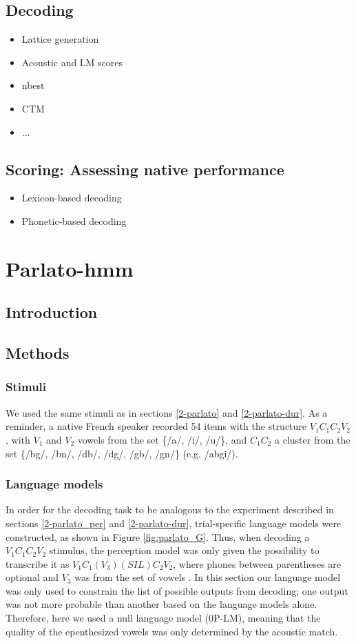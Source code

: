 \subsection{Decoding}
\begin{itemize}
\item Lattice generation
\item Acoustic and LM scores 
\item nbest
\item CTM
\item ...
\end{itemize}

\subsection{Scoring: Assessing native performance}
\begin{itemize}
\item Lexicon-based decoding
\item Phonetic-based decoding
\end{itemize}

\newpage
\section{{\color{red}Parlato-hmm}} \label{3-parlato-hmm}
\subsection{Introduction}
\subsection{Methods}
\subsubsection{Stimuli}
We used the same stimuli as in sections \ref{2-parlato} and \ref{2-parlato-dur}. As a reminder, a native French speaker recorded 54 items with the structure $V_{1}C_{1}C_{2}V_{2}$, with $V_{1}$ and $V_{2}$ vowels from the set \{/a/, /i/, /u/\}, and $C_{1}C_{2}$ a cluster from the set \{/bg/, /bn/, /db/, /dg/, /gb/, /gn/\} (e.g. /abgi/).

\subsubsection{Language models}
In order for the decoding task to be analogous to the experiment described in sections \ref{2-parlato_per} and \ref{2-parlato-dur}, trial-specific language models were constructed, as shown in Figure \ref{fig:parlato_G}. Thus, when decoding a $V_{1}C_{1}C_{2}V_{2}$ stimulus, the perception model was only given the possibility to transcribe it as $V_{1}C_{1}(V_{3})(SIL)C_{2}V_{2}$, where phones between parentheses are optional and $V_{3}$ was from the set of vowels . In this section our language model was only used to constrain the list of possible outputs from decoding; one output was not more probable than another based on the language models alone. Therefore, here we used a null language model (\textsc{0P-LM}), meaning that the quality of the epenthesized vowels was only determined by the acoustic match.

